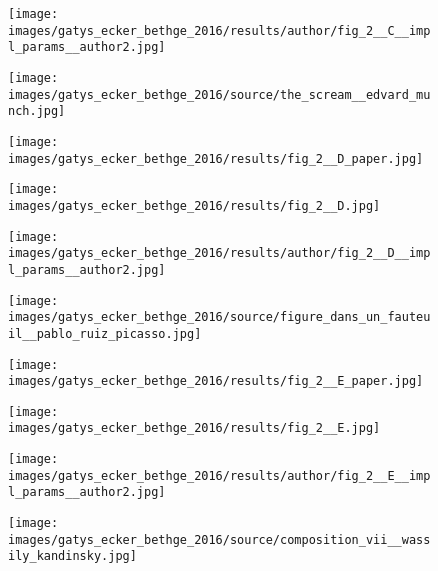 \begin{figure}[H]
\begin{minipage}[t]{0.24\textwidth}
	\end{minipage}
	\hfill%
	\begin{minipage}[t]{0.24\textwidth}
		\centering
		\texttt{[image: images/gatys\_ecker\_bethge\_2016/results/author/fig\_2\_\_C\_\_impl\_params\_\_author2.jpg]}
	\end{minipage}
	\hfill%
	\begin{minipage}[t]{0.24\textwidth}
		\centering
		\texttt{[image: images/gatys\_ecker\_bethge\_2016/source/the\_scream\_\_edvard\_munch.jpg]}
	\end{minipage}
	\hfill%
	\begin{minipage}[t]{0.24\textwidth}
		\centering
		\texttt{[image: images/gatys\_ecker\_bethge\_2016/results/fig\_2\_\_D\_paper.jpg]}
	\end{minipage}
	\hfill%
	\begin{minipage}[t]{0.24\textwidth}
		\centering
		\texttt{[image: images/gatys\_ecker\_bethge\_2016/results/fig\_2\_\_D.jpg]}
	\end{minipage}
	\hfill%
	\begin{minipage}[t]{0.24\textwidth}
		\centering
		\texttt{[image: images/gatys\_ecker\_bethge\_2016/results/author/fig\_2\_\_D\_\_impl\_params\_\_author2.jpg]}
	\end{minipage}
	\hfill%
	\begin{minipage}[t]{0.24\textwidth}
		\centering
		\texttt{[image: images/gatys\_ecker\_bethge\_2016/source/figure\_dans\_un\_fauteuil\_\_pablo\_ruiz\_picasso.jpg]}
	\end{minipage}
	\hfill%
	\begin{minipage}[t]{0.24\textwidth}
		\centering
		\texttt{[image: images/gatys\_ecker\_bethge\_2016/results/fig\_2\_\_E\_paper.jpg]}
	\end{minipage}
	\hfill%
	\begin{minipage}[t]{0.24\textwidth}
		\centering
		\texttt{[image: images/gatys\_ecker\_bethge\_2016/results/fig\_2\_\_E.jpg]}
	\end{minipage}
	\hfill%
	\begin{minipage}[t]{0.24\textwidth}
		\centering
		\texttt{[image: images/gatys\_ecker\_bethge\_2016/results/author/fig\_2\_\_E\_\_impl\_params\_\_author2.jpg]}
	\end{minipage}
	\hfill%
	\begin{minipage}[t]{0.24\textwidth}
		\centering
		\texttt{[image: images/gatys\_ecker\_bethge\_2016/source/composition\_vii\_\_wassily\_kandinsky.jpg]}

\end{minipage}
\end{figure}
